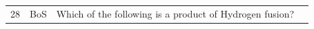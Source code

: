 \documentclass[10pt]{article}
\begin{document}
\begin{tiny}
\begin{longtable}{r p{0.3in} p{1.212in} p{3.8in}}
    28 &          BoS &                                                                                                                                                                                                                          Which of the following is a product of Hydrogen fusion? &                                                                                                                                                                                                                                                                                                                                                                                                                                                                                                                                                                                                                                                                                                                                                                                                                                                                                                                                                                                                                                                                                                                                                                                                                                                                                                                                                                                                                                                                                                                                                                                                                                                                                                                                                                                                                                                                                                                                                                                                                                                                                                                                                                                                                                                                                                                                                                                                                                                                                                                                                                                                                                                                                                                                                                                                                                                                                                                                                                                                                                                                                               
\end{longtable}
\end{tiny}
\end{document}
